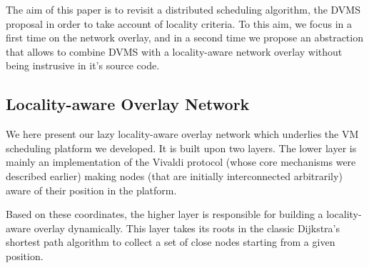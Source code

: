 The aim of this paper is to revisit a distributed scheduling algorithm,
the DVMS proposal in order to take account of locality criteria.  To this aim,
we focus in a first time on the network overlay, and in a second time we propose
an abstraction that allows to combine DVMS with a locality-aware network overlay
without being instrusive in it's source code.

\subsection{Locality-aware Overlay Network \label{ssec:lao}}

We here present our lazy locality-aware overlay network which underlies the VM scheduling
platform we developed. It is built upon two layers. The lower layer is mainly an
implementation of the Vivaldi protocol (whose core mechanisms were described earlier)
making nodes (that are initially interconnected arbitrarily) aware of their position in
the platform.

Based on these coordinates, the higher layer is responsible for building a locality-aware
overlay dynamically. This layer takes its roots in the classic Dijkstra's shortest path
algorithm to collect a set of close nodes starting from a given position.







